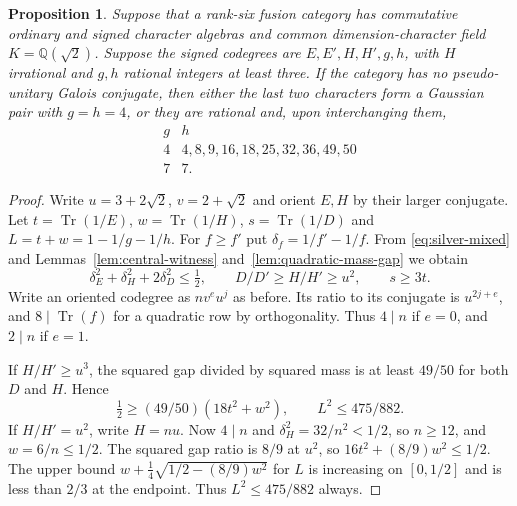 \documentclass[11pt,reqno]{amsart}
\newtheorem{proposition}[theorem]{Proposition}
\theoremstyle{remark}\newtheorem{remark}[theorem]{Remark}
\numberwithin{equation}{section}
\begin{document}
\begin{proposition}\label{prop:silver-two-pair-finite}
Suppose that a rank-six fusion category has commutative ordinary and
signed character algebras and common dimension-character field
$K=\mathbb Q(\sqrt2)$. Suppose the signed codegrees are
$E,E',H,H',g,h$, with $H$ irrational and $g,h$ rational integers at least three.
If the category has no pseudo-unitary Galois conjugate, then either the
last two characters form a Gaussian pair with $g=h=4$, or they are
rational and, upon interchanging them,
\[
\begin{array}{c|l}
 g&h\\\hline
 4&4,8,9,16,18,25,32,36,49,50\\
 7&7 .
\end{array}
\]
\end{proposition}
\begin{proof}
Write $u=3+2\sqrt2$, $v=2+\sqrt2$ and orient $E,H$ by their
larger conjugate. Let $t=\operatorname{Tr}(1/E)$,
$w=\operatorname{Tr}(1/H)$, $s=\operatorname{Tr}(1/D)$ and
$L=t+w=1-1/g-1/h$. For $f\ge f'$ put $\delta_f=1/f'-1/f$.
From \eqref{eq:silver-mixed} and Lemmas~\ref{lem:central-witness}
and~\ref{lem:quadratic-mass-gap} we obtain
\[
 \delta_E^2+\delta_H^2+2\delta_D^2\le\tfrac12,\qquad
 D/D'\ge H/H'\ge u^2,\qquad s\ge3t .
\]
Write an oriented codegree as $nv^eu^j$ as before. Its ratio to
its conjugate is $u^{2j+e}$, and $8\mid\operatorname{Tr}(f)$
for a quadratic row by orthogonality. Thus $4\mid n$ if $e=0$,
and $2\mid n$ if $e=1$.

If $H/H'\ge u^3$, the squared gap divided by squared mass is at least
$49/50$ for both $D$ and $H$. Hence
\[
 \tfrac12\ge(49/50)(18t^2+w^2),\qquad L^2\le 475/882.
\]
If $H/H'=u^2$, write $H=nu$. Now $4\mid n$ and
$\delta_H^2=32/n^2<1/2$, so $n\ge12$, and $w=6/n\le1/2$.
The squared gap ratio is $8/9$ at $u^2$, so
$16t^2+(8/9)w^2\le1/2$. The upper bound
$w+\tfrac14\sqrt{1/2-(8/9)w^2}$ for $L$ is increasing on
$[0,1/2]$ and is less than $2/3$ at the endpoint. Thus
$L^2\le475/882$ always.


\end{proof}
\end{document}
